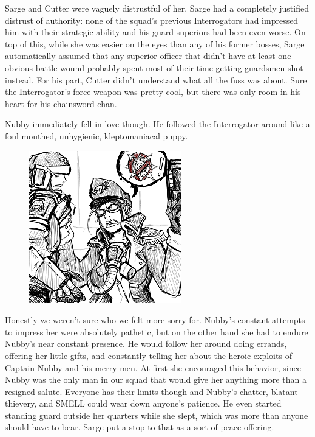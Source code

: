 Sarge and Cutter were vaguely distrustful of her. Sarge had a completely justified distrust of authority: 
none of the squad’s previous Interrogators had impressed him with their strategic ability and his guard superiors had been even worse. 
On top of this, while she was easier on the eyes than any of his former bosses, Sarge automatically assumed that any superior officer that didn’t have at least one obvious battle wound probably spent most of their time getting guardsmen shot instead. 
For his part, Cutter didn’t understand what all the fuss was about. 
Sure the Interrogator’s force weapon was pretty cool, but there was only room in his heart for his chainsword-chan.

Nubby immediately fell in love though. He followed the Interrogator around like a foul mouthed, unhygienic, kleptomaniacal puppy.

\begin{figure}
	\begin{center}
		\includegraphics[width=\figwidth]{pics/5/4.png}
	\end{center}
\end{figure}
Honestly we weren’t sure who we felt more sorry for. 
Nubby’s constant attempts to impress her were absolutely pathetic, but on the other hand she had to endure Nubby’s near constant presence. 
He would follow her around doing errands, offering her little gifts, and constantly telling her about the heroic exploits of Captain Nubby and his merry men. 
At first she encouraged this behavior, since Nubby was the only man in our squad that would give her anything more than a resigned salute. 
Everyone has their limits though and Nubby’s chatter, blatant thievery, and SMELL could wear down anyone’s patience. 
He even started standing guard outside her quarters while she slept, which was more than anyone should have to bear. 
Sarge put a stop to that as a sort of peace offering. 

